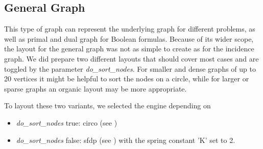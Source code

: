 \documentclass[a4paper, 12pt, bibliography=totoc]{scrartcl}
\begin{document}



\subsection{General Graph}
This type of graph can represent the underlying graph for different problems, as well as primal and dual graph for Boolean formulas.
Because of its wider scope, the layout for the general graph was not as simple to create as for the incidence graph.
We did prepare two different layouts that should cover most cases and are toggled by the parameter \textit{do\_sort\_nodes}.
For smaller and dense graphs of up to 20 vertices it might be helpful to sort the nodes on a circle, while for larger or sparse graphs an organic layout may be more appropriate.

To layout these two variants, we selected the engine depending on
\begin{itemize}
	\item \textit{do\_sort\_nodes} true: circo (see \cite{ST99})
	\item \textit{do\_sort\_nodes} false: sfdp (see \cite{Hu05}) with the spring constant 'K' set to 2.
\end{itemize}
\end{document}
